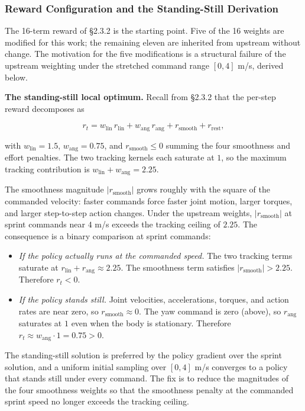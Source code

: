 \subsubsection{Reward Configuration and the Standing-Still Derivation}

The 16-term reward of \S2.3.2 is the starting point. Five of the 16 weights are modified for this work; the remaining eleven are inherited from upstream without change. The motivation for the five modifications is a structural failure of the upstream weighting under the stretched command range $[0, 4]$ m/s, derived below.

\textbf{The standing-still local optimum.} Recall from \S2.3.2 that the per-step reward decomposes as

\[
r_t = w_{\mathrm{lin}}\, r_{\mathrm{lin}} + w_{\mathrm{ang}}\, r_{\mathrm{ang}} + r_{\mathrm{smooth}} + r_{\mathrm{rest}},
\]

with $w_{\mathrm{lin}} = 1.5$, $w_{\mathrm{ang}} = 0.75$, and $r_{\mathrm{smooth}} \le 0$ summing the four smoothness and effort penalties. The two tracking kernels each saturate at $1$, so the maximum tracking contribution is $w_{\mathrm{lin}} + w_{\mathrm{ang}} = 2.25$.

The smoothness magnitude $|r_{\mathrm{smooth}}|$ grows roughly with the square of the commanded velocity: faster commands force faster joint motion, larger torques, and larger step-to-step action changes. Under the upstream weights, $|r_{\mathrm{smooth}}|$ at sprint commands near $4$ m/s exceeds the tracking ceiling of $2.25$. The consequence is a binary comparison at sprint commands:

\begin{itemize}
  \item \textit{If the policy actually runs at the commanded speed.} The two tracking terms saturate at $r_{\mathrm{lin}} + r_{\mathrm{ang}} \approx 2.25$. The smoothness term satisfies $|r_{\mathrm{smooth}}| > 2.25$. Therefore $r_t < 0$.
  \item \textit{If the policy stands still.} Joint velocities, accelerations, torques, and action rates are near zero, so $r_{\mathrm{smooth}} \approx 0$. The yaw command is zero (above), so $r_{\mathrm{ang}}$ saturates at $1$ even when the body is stationary. Therefore $r_t \approx w_{\mathrm{ang}} \cdot 1 = 0.75 > 0$.
\end{itemize}

The standing-still solution is preferred by the policy gradient over the sprint solution, and a uniform initial sampling over $[0, 4]$ m/s converges to a policy that stands still under every command. The fix is to reduce the magnitudes of the four smoothness weights so that the smoothness penalty at the commanded sprint speed no longer exceeds the tracking ceiling.

